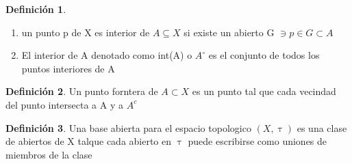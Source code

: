 \documentclass{article}
\theoremstyle{definition}
\newtheorem{definition}{Definición}[section]
\begin{document}
\begin{definition}
	\begin{enumerate}
		\item un punto p de X es interior de $A\subseteq X$ si existe un abierto G $\ni p\in G\subset A$
		\item El interior de A denotado como int(A) o $A^{\circ}$ es el conjunto de todos los puntos interiores de A
	\end{enumerate}
\end{definition}
\begin{definition}
	Un punto forntera de $A\subset X$ es un punto tal que cada vecindad del punto intersecta a A y a $A^c$
\end{definition}
\begin{definition}
	Una base abierta para el espacio topologico $(X,\uptau)$ es una clase de abiertos de X talque cada abierto en $\uptau$ puede escribirse como uniones de miembros de la clase
\end{definition}
\end{document}

